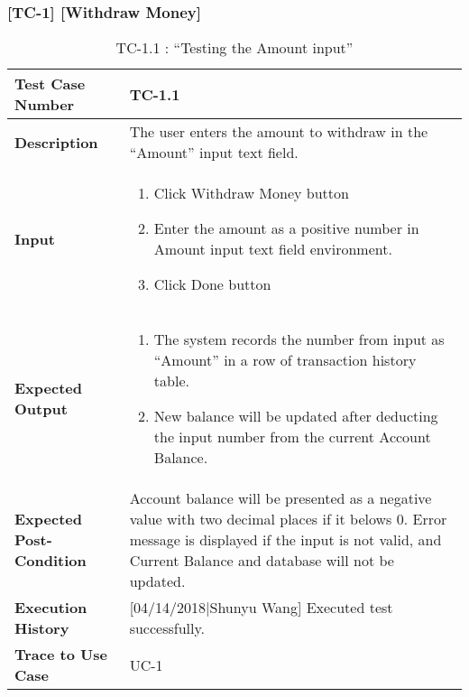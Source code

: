 \documentclass[12pt]{article}
\begin{document}
\subsubsection{[TC-1] [Withdraw Money]} \label{tc:1}
\begin{table}[H]
\caption{ TC-1.1 : “Testing the Amount input”}
\begin{center}
\begin{tabular}{|p{5	cm}|p{12cm}|}
\hline
\bf Test Case Number & 
TC-1.1 \\
\hline
\bf Description & 
The user enters the amount to withdraw in the “Amount” input text field.\\
\hline
\bf Input & 
\begin{enumerate}
  \item Click Withdraw Money button
  \item Enter the amount as a positive number in Amount input text field environment.
  \item Click Done button
\end{enumerate} \\
\hline
\bf Expected Output & 
\begin{enumerate}
  \item The system records the number from input as “Amount” in a row of transaction history table.
  \item New balance will be updated after deducting the input number from the current Account Balance.
\end{enumerate} \\
\hline
\bf Expected Post-Condition & 
Account balance will be presented as a negative value with two decimal places if it belows 0. Error message is displayed if the input is not valid, 
and Current Balance and database will not be updated.\\
\hline
\bf Execution History & 
[04/14/2018|Shunyu Wang] Executed test successfully.\\
\hline
\bf Trace to Use Case & 
UC-1\\
\hline

\end{tabular}
\end{center}
\end{table}
\end{document}
